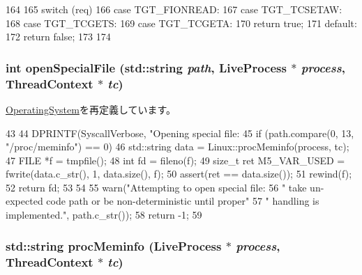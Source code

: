 \begin{DoxyCode}
164     {
165         switch (req) {
166           case TGT_FIONREAD:
167           case TGT_TCSETAW:
168           case TGT_TCGETS:
169           case TGT_TCGETA:
170             return true;
171           default:
172             return false;
173         }
174     }
\end{DoxyCode}
\hypertarget{classLinux_a4d991052a0ab25e074acd669d8570c30}{
\subsubsection[{openSpecialFile}]{\setlength{\rightskip}{0pt plus 5cm}int openSpecialFile (std::string {\em path}, \/  {\bf LiveProcess} $\ast$ {\em process}, \/  {\bf ThreadContext} $\ast$ {\em tc})}}
\label{classLinux_a4d991052a0ab25e074acd669d8570c30}


\hyperlink{classOperatingSystem_a4d991052a0ab25e074acd669d8570c30}{OperatingSystem}を再定義しています。


\begin{DoxyCode}
43 {
44     DPRINTF(SyscallVerbose, "Opening special file: %
45     if (path.compare(0, 13, "/proc/meminfo") == 0) {
46         std::string data = Linux::procMeminfo(process, tc);
47         FILE *f = tmpfile();
48         int fd = fileno(f);
49         size_t ret M5_VAR_USED = fwrite(data.c_str(), 1, data.size(), f);
50         assert(ret == data.size());
51         rewind(f);
52         return fd;
53     }
54 
55     warn("Attempting to open special file: %
56             " take un-expected code path or be non-deterministic until proper"
57             "  handling is implemented.\n", path.c_str());
58     return -1;
59 }
\end{DoxyCode}
\hypertarget{classLinux_a01194ef4e453eb1292403de676b86dd9}{
\subsubsection[{procMeminfo}]{\setlength{\rightskip}{0pt plus 5cm}std::string procMeminfo ({\bf LiveProcess} $\ast$ {\em process}, \/  {\bf ThreadContext} $\ast$ {\em tc})}}
\label{classLinux_a01194ef4e453eb1292403de676b86dd9}



